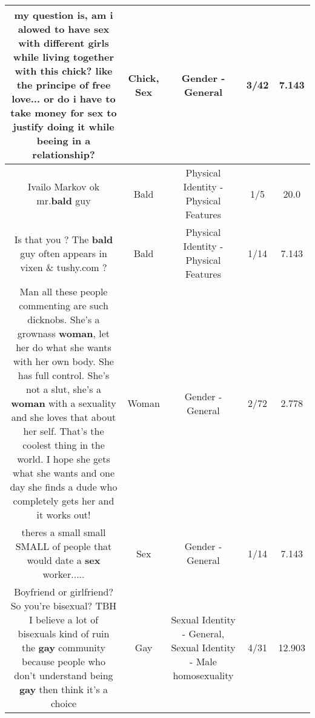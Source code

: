 \documentclass[11pt]{article}
\newlength\mylength
\begin{document}
\begin{center}
\begin{longtable}{|C{.65\mylength}|C{.30\mylength}|C{.12\mylength}|C{.12\mylength}|C{.12\mylength}|}
  \small my question is, am i alowed to have \textbf{sex} with different girls while living together with this \textbf{chick}? like the principe of free love... or do i have to take money for \textbf{sex} to justify doing it while beeing in a relationship?\normalsize   & Chick, Sex & Gender - General & 3/42 & 7.143 \\  \hline
  \small Ivailo Markov ok mr.\textbf{bald} guy\normalsize   & Bald & Physical Identity - Physical Features & 1/5 & 20.0 \\  \hline
  \small Is that you ? The \textbf{bald} guy often appears in vixen \& tushy.com ?\normalsize   & Bald & Physical Identity - Physical Features & 1/14 & 7.143 \\  \hline
  \small Man all these people commenting are such dicknobs. She's a grownass \textbf{woman}, let her do what she wants with her own body. She has full control. She's not a slut, she's a \textbf{woman} with a sexuality and she loves that about her self. That's the coolest thing in the world. I hope she gets what she wants and one day she finds a dude who completely gets her and it works out!\normalsize   & Woman & Gender - General & 2/72 & 2.778 \\  \hline
  \small theres a small small SMALL  of people that would date a \textbf{sex} worker.....\normalsize   & Sex & Gender - General & 1/14 & 7.143 \\  \hline
  \small Boyfriend or girlfriend? So you're bisexual? TBH I believe a lot of bisexuals kind of ruin the \textbf{g\textbf{ay}} community because people who don't understand being \textbf{g\textbf{ay}} then think it's a choice\normalsize   & Gay & Sexual Identity - General, Sexual Identity - Male homosexuality & 4/31 & 12.903 \\  \hline

\end{longtable}
\end{center}
\end{document}
